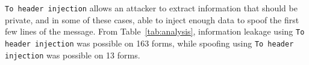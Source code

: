 \texttt{To header injection} allows an attacker to extract information that should be private,
and in some of these cases, able to inject enough data to spoof the first few lines of the \email message. From Table~\ref{tab:analysis}, information leakage using \texttt{To header injection} was possible on 163 forms, while spoofing using \texttt{To header injection} was possible on 13 forms.
    
    
